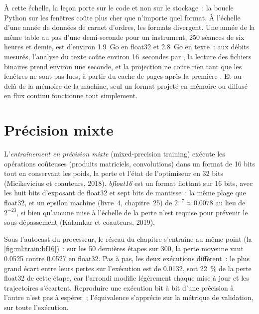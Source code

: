 À cette échelle, la leçon porte sur le code et non sur le stockage~: la boucle Python sur les fenêtres coûte plus cher que n'importe quel format. À l'échelle d'une
année de données de carnet d'ordres, les formats divergent. Une année de la même table au pas d'une demi-seconde pour un instrument, 250 séances de six heures et
demie, est d'environ 1.9~Go en float32 et 2.8~Go en texte~: aux débits mesurés, l'analyse du texte coûte environ 16~secondes par
, la lecture des fichiers binaires prend environ une seconde, et la projection ne coûte rien tant que les fenêtres ne sont pas lues, à partir du cache de pages après la première .
Et au-delà de la mémoire de la machine, seul un format projeté en mémoire ou diffusé en flux continu fonctionne tout simplement.

\section{Précision mixte}

\begin{definition}\label{def:ml:training-infrastructure:mixed}
L'\emph{entraînement en précision mixte} (mixed-precision training) exécute les opérations coûteuses (produits matriciels, convolutions)
dans un format de 16 bits tout en conservant les poids, la perte et l'état de l'optimiseur en 32 bits (Micikevicius et coauteurs,
2018). \emph{bfloat16} est un format flottant sur 16 bits, avec les huit bits d'exposant de float32 et sept bits
de mantisse~: la même plage que float32, et un epsilon machine (livre~4, chapitre~25) de $2^{-7}\approx0.0078$ au lieu de $2^{-23}$, si bien qu'aucune
mise à l'échelle de la perte n'est requise pour prévenir le sous-dépassement (Kalamkar et coauteurs, 2019).
\end{definition}

Sous l'autocast  du processeur, le réseau du chapitre s'entraîne au même point (la \cref{fig:ml:train:bf16})~: sur les 50 dernières
étapes sur 300, la perte moyenne vaut 0.0525 contre 0.0527 en float32. Pas à pas, les deux exécutions diffèrent~: le plus grand écart
entre leurs pertes sur l'exécution est de 0.0132, soit 22~\% de la perte float32 de cette étape, car l'arrondi modifie légèrement chaque mise à jour et les
trajectoires s'écartent. Reproduire une exécution bit à bit d'une précision à l'autre n'est pas à espérer~; l'équivalence s'apprécie sur la
métrique de validation, sur toute l'exécution.

